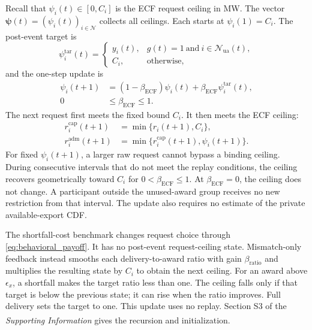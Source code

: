 \documentclass[twoside,twocolumn,9pt]{article}
\newcommand{\suppref}{\textit{Supporting Information}\textsuperscript{\dag}}
\begin{document}
{Recall that $\psi_i(t)\in[0,C_i]$ is the ECF request ceiling in MW.
The vector $\boldsymbol\psi(t)=(\psi_i(t))_{i\in\mathcal N}$ collects all
ceilings. Each starts at $\psi_i(1)=C_i$. The post-event target is
\begin{equation}
\psi_i^{\mathrm{tar}}(t)=
\begin{cases}
y_i(t),&g(t)=1\ \text{and}\ i\in\mathcal N_{\mathrm{ua}}(t),\\
C_i,&\text{otherwise},
\end{cases}
\label{eq:metered_ceiling_target}
\end{equation}
and the one-step update is
\begin{equation}
\begin{aligned}
\psi_i(t+1)&=(1-\beta_{\mathrm{ECF}})\psi_i(t)
+\beta_{\mathrm{ECF}}\psi_i^{\mathrm{tar}}(t),\\[-0.2em]
0&\le\beta_{\mathrm{ECF}}\le1.
\end{aligned}
\label{eq:metered_ceiling_update}
\end{equation}
The next request first meets the fixed bound $C_i$. It then meets the
ECF ceiling:
\begin{align}
r_i^{\mathrm{cap}}(t+1)&=\min\{r_i(t+1),C_i\},
\label{eq:capacity_limited_request}\\
r_i^{\mathrm{adm}}(t+1)&=\min\{r_i^{\mathrm{cap}}(t+1),\psi_i(t+1)\}.
\label{eq:capacity_limited_request_claim}
\end{align}
For fixed $\psi_i(t+1)$, a larger raw request cannot bypass a binding ceiling.
During consecutive intervals that do not meet the replay conditions, the
ceiling recovers geometrically toward $C_i$ for
$0<\beta_{\mathrm{ECF}}\le1$. At $\beta_{\mathrm{ECF}}=0$, the ceiling does not
change. A participant outside the unused-award group receives no new
restriction from that interval.
The update also requires no estimate of the private available-export CDF.

The shortfall-cost benchmark changes request choice through
\eqref{eq:behavioral_payoff}. It has no post-event request-ceiling state.
Mismatch-only feedback instead smooths each delivery-to-award ratio with gain
$\beta_{\mathrm{ratio}}$ and multiplies the resulting state by $C_i$ to obtain
the next ceiling. For an award above $\epsilon_x$, a shortfall makes the target
ratio less than one. The ceiling
falls only if that target is below the previous state; it can rise when the
ratio improves. Full delivery sets the target to one. This update uses no
replay. Section S3 of the \suppref{} gives the recursion and initialization.

}
\end{document}
